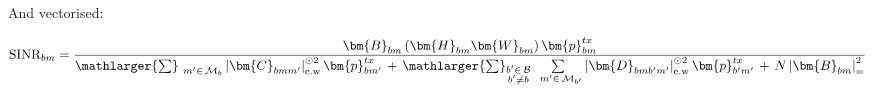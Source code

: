 And vectorised:

\begin{equation}
    \text{SINR}_{bm} = \frac{\bm{B}_{bm} \left( \bm{H}_{bm} \bm{W}_{bm} \right) \bm{p}^{tx}_{bm}}{\mathlarger{\sum}_{\ m' \in \hspace{.05cm} \mathcal{M}_b} \left| \bm{C}_{bmm'}\right|_{\text{e.w}}^{\odot2} \bm{p}^{tx}_{bm'} \hspace{.05cm} + \hspace{.05cm}  \mathlarger{\sum}_{\substack{b' \in \hspace{.05cm} \mathcal{B} \\ b' \neq b}} \sum\limits_{\ \hspace{.05cm} m' \in \hspace{.05cm} \mathcal{M}_{b'}} \left| \bm{D}_{bmb'm'} \right|_{\text{e.w}}^{\odot2} \bm{p}^{tx}_{b'm'} \hspace{.05cm} + \hspace{.05cm} N \left| \bm{B}_{bm} \right|_{=}^2 }
\end{equation}
